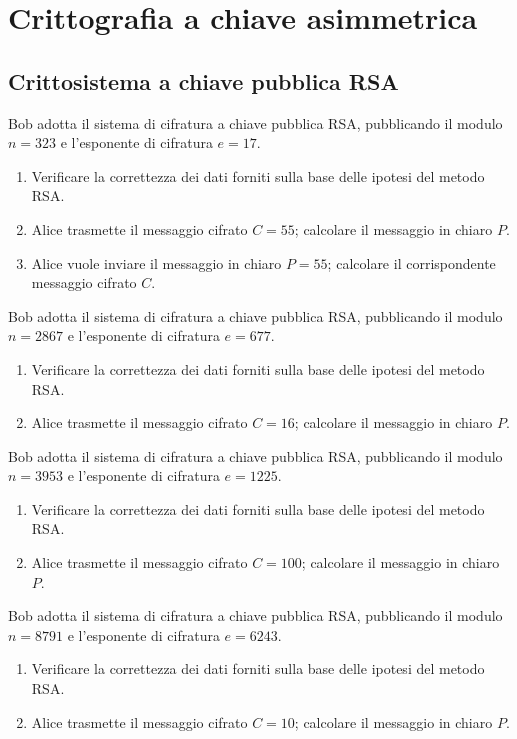 
\chapter{Crittografia a chiave asimmetrica}

    \bigskip
    \section{Crittosistema a chiave pubblica RSA}
        Bob adotta il sistema di cifratura a chiave pubblica RSA, pubblicando il modulo $n=323$ e 
        l'esponente di cifratura $e=17$.
        \begin{enumerate}
            \item Verificare la correttezza dei dati forniti sulla base delle ipotesi del metodo RSA.
            \item Alice trasmette il messaggio cifrato $C=55$; calcolare il messaggio in chiaro $P$.
            \item Alice vuole inviare il messaggio in chiaro $P=55$; calcolare il corrispondente messaggio 
                cifrato $C$.
        \end{enumerate}

        Bob adotta il sistema di cifratura a chiave pubblica RSA, pubblicando il modulo $n=2867$ e 
        l'esponente di cifratura $e=677$.
        \begin{enumerate}
            \item Verificare la correttezza dei dati forniti sulla base delle ipotesi del metodo RSA.
            \item Alice trasmette il messaggio cifrato $C=16$; calcolare il messaggio in chiaro $P$.
        \end{enumerate}

        Bob adotta il sistema di cifratura a chiave pubblica RSA, pubblicando il modulo $n=3953$ e 
        l'esponente di cifratura $e=1225$.
        \begin{enumerate}
            \item Verificare la correttezza dei dati forniti sulla base delle ipotesi del metodo RSA.
            \item Alice trasmette il messaggio cifrato $C=100$; calcolare il messaggio in chiaro $P$.
        \end{enumerate}

        Bob adotta il sistema di cifratura a chiave pubblica RSA, pubblicando il modulo $n=8791$ e 
        l'esponente di cifratura $e=6243$.
        \begin{enumerate}
            \item Verificare la correttezza dei dati forniti sulla base delle ipotesi del metodo RSA.
            \item Alice trasmette il messaggio cifrato $C=10$; calcolare il messaggio in chiaro $P$.
        \end{enumerate}


